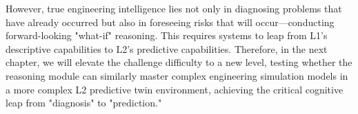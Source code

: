 However, true engineering intelligence lies not only in diagnosing problems that have already occurred but also in foreseeing risks that will occur—conducting forward-looking "what-if" reasoning. This requires systems to leap from L1's descriptive capabilities to L2's predictive capabilities. Therefore, in the next chapter, we will elevate the challenge difficulty to a new level, testing whether the reasoning module can similarly master complex engineering simulation models in a more complex L2 predictive twin environment, achieving the critical cognitive leap from "diagnosis" to "prediction."
